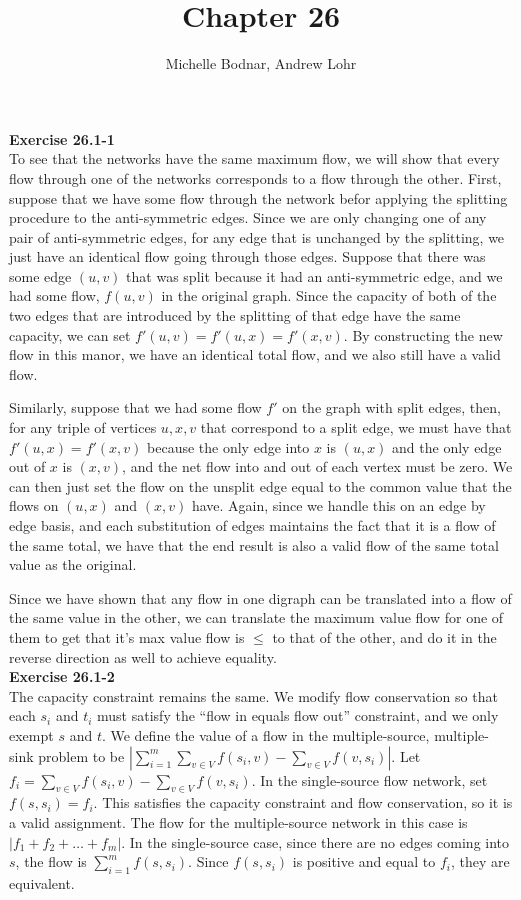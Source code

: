 \documentclass{article}
\title{Chapter 26}
\author{Michelle Bodnar, Andrew Lohr}
\begin{document}
\maketitle

\noindent\textbf{Exercise 26.1-1}\\

To see that the networks have the same maximum flow, we will show that every flow through one of the networks corresponds to a flow through the other. First, suppose that we have some flow through the network befor applying the splitting procedure to the anti-symmetric edges. Since we are only changing one of any pair of anti-symmetric edges, for any edge that is unchanged by the splitting, we just have an identical flow going through those edges. Suppose that there was some edge $(u,v)$ that was split because it had an anti-symmetric edge, and we had some flow, $f(u,v)$ in the original graph. Since the capacity of both of the two edges that are introduced by the splitting of that edge have the same capacity, we can set $f'(u,v) = f'(u,x) = f'(x,v)$. By constructing the new flow in this manor, we have an identical total flow, and we also still have a valid flow.

Similarly, suppose that we had some flow $f'$ on the graph with split edges, then, for any triple of vertices $u,x,v$ that correspond to a split edge, we must have that $f'(u,x) = f'(x,v)$ because the only edge into $x$ is $(u,x)$ and the only edge out of $x$ is $(x,v)$, and the net flow into and out of each vertex must be zero. We can then just set the flow on the unsplit edge equal to the common value that the flows on $(u,x)$ and $(x,v)$ have. Again, since we handle this on an edge by edge basis, and each substitution of edges maintains the fact that it is a flow of the same total, we have that the end result is also a valid flow of the same total value as the original.

Since we have shown that any flow in one digraph can be translated into a flow of the same value in the other, we can translate the maximum value flow for one of them to get that it's max value flow is $\le$ to that of the other, and do it in the reverse direction as well to achieve equality.\\

\noindent\textbf{Exercise 26.1-2}\\

The capacity constraint remains the same.  We modify flow conservation so that each $s_i$ and $t_i$ must satisfy the ``flow in equals flow out'' constraint, and we only exempt $s$ and $t$.  We define the value of a flow in the multiple-source, multiple-sink problem to be $\left|\sum_{i=1}^m \sum_{v\in V} f(s_i,v) - \sum_{v\in V} f(v,s_i)\right|$.  Let $f_i =  \sum_{v\in V} f(s_i,v) - \sum_{v\in V} f(v,s_i)$.  In the single-source flow network, set $f(s, s_i) = f_i$.  This satisfies the capacity constraint and flow conservation, so it is a valid assignment.  The flow for the multiple-source network in this case is $|f_1 + f_2 + \dots + f_m|$.  In the single-source case, since there are no edges coming into $s$, the flow is $\sum_{i=1}^m f(s,s_i)$.  Since $f(s,s_i)$ is positive and equal to $f_i$, they are equivalent. \\
\end{document}
